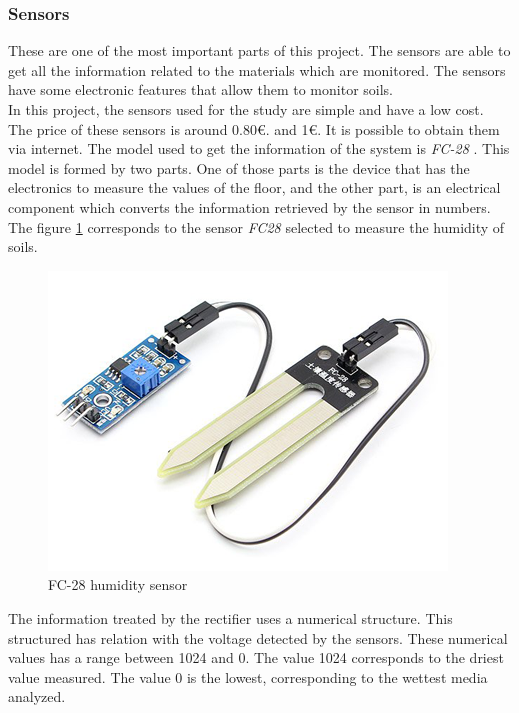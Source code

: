 \subsubsection{Sensors}

These are one of the most important parts of this project. The sensors are able to get all the information related to the materials which are monitored. The sensors have some electronic features that allow them to monitor soils.\\

In this project, the sensors used for the study are simple and have a low cost. The price of these sensors is around 0.80\euro . and 1\euro . It is possible to obtain them via internet. The model used to get the information of the system is \textit{FC-28} \cite{FC_28}. This model is formed by two parts. One of those parts is the device that has the electronics to measure the values of the floor, and the other part, is an electrical component which converts the information retrieved by the sensor in numbers.\\

The figure \ref{FC28} corresponds to the sensor \textit{FC28} selected to measure the humidity of soils.

\begin{figure}[H]
\begin{centering}
\includegraphics[scale=0.8]{IMGS/FC-28.png}
\caption{FC-28 humidity sensor \label{FC28}}
\end{centering}
\end{figure}

The information treated by the rectifier uses a numerical structure. This structured has relation with the voltage detected by the sensors. These numerical values has a range between 1024 and 0. The value 1024 corresponds to the driest value measured. The value 0 is the lowest, corresponding to the wettest media analyzed.\\

